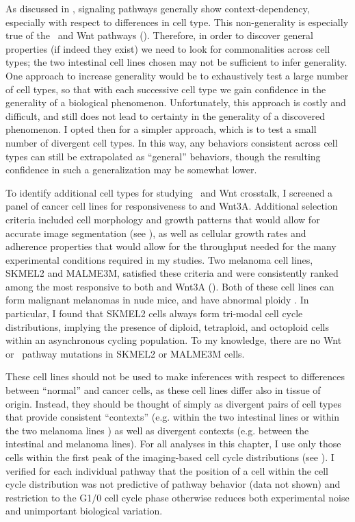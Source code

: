 As discussed in , signaling
pathways generally show context-dependency, especially with respect
to differences in cell type. This non-generality is especially
true of the \tgfbsf\ and Wnt pathways ().
Therefore, in order to discover general properties (if indeed they exist)
we need to look for commonalities across cell types; the two intestinal
cell lines chosen may not be sufficient to infer generality. 
One approach to increase generality would be to
exhaustively test a large number of cell types, so that with each
successive cell type we gain confidence in the generality of a biological
phenomenon. Unfortunately, this approach is costly and difficult, and still
does not lead to certainty in the generality of a discovered phenomenon.
I opted then for a simpler approach, which is to test a small number of
divergent cell types. In this way, any behaviors consistent
across cell types can still be extrapolated as ``general'' behaviors,
though the resulting confidence in such a generalization may be somewhat
lower. 


To identify additional cell types for studying \tgfbsf\ and Wnt
crosstalk, I screened a panel of cancer cell lines for responsiveness
to  and Wnt3A. 
Additional selection criteria included cell morphology and
growth patterns that would allow for accurate image segmentation (see
), as well as cellular
growth rates and adherence properties that would
allow for the throughput needed for the many experimental conditions
required in my studies.
Two melanoma cell lines, SKMEL2 and MALME3M,
satisfied these criteria and were consistently ranked among the most
responsive to both  and Wnt3A ().
Both of these cell lines can form malignant melanomas in nude mice, and
have abnormal ploidy  \cite{Fogh1977}. In particular, I found that SKMEL2 cells always
form tri-modal cell cycle distributions, implying the presence of diploid,
tetraploid, and octoploid cells within an asynchronous cycling population.
To my knowledge, there are no Wnt or \tgfbsf\ pathway mutations in SKMEL2
or MALME3M cells.


These cell lines should not be used to make
inferences with respect to differences between ``normal'' and cancer
cells, as these cell lines differ also in tissue of origin. Instead,
they should be thought of simply as divergent pairs of cell types that provide
consistent ``contexts'' (e.g. within the two intestinal lines or
within the two melanoma lines ) as well as divergent contexts (e.g.
between the intestinal and melanoma lines).
For all analyses in this chapter, I use only those cells
within the first peak of the imaging-based cell cycle distributions
(see ). I verified for each individual
pathway that the position of a cell within the cell cycle distribution
was not predictive of pathway behavior (data not shown) and
restriction to the G1/0 cell cycle phase otherwise reduces both experimental noise and
unimportant biological variation.
  
